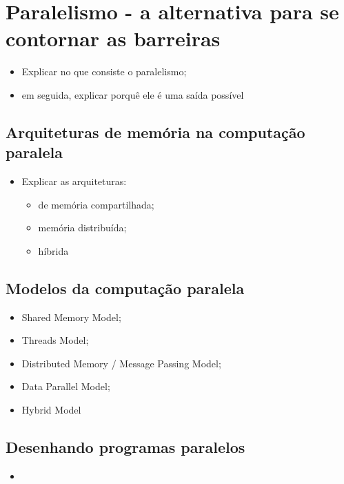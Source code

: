 \section{Paralelismo - a alternativa para se contornar as barreiras}

    \begin{itemize}
        \item Explicar no que consiste o paralelismo;
        \item em seguida, explicar porquê ele é uma saída possível
    \end{itemize}
    
    \subsection{Arquiteturas de memória na computação paralela}
    
        \begin{itemize}
            \item Explicar as arquiteturas:
            \begin{itemize}
                \item de memória compartilhada;
                \item memória distribuída;
                \item híbrida
            \end{itemize}
        \end{itemize}
    
    \subsection{Modelos da computação paralela}
    
    
        \begin{itemize}
            \item Shared Memory Model;
            \item Threads Model;
            \item Distributed Memory / Message Passing Model;
            \item Data Parallel Model;
            \item Hybrid Model
        \end{itemize}
    
    \subsection{Desenhando programas paralelos}
    
    
        \begin{itemize}
            \item 
        \end{itemize}